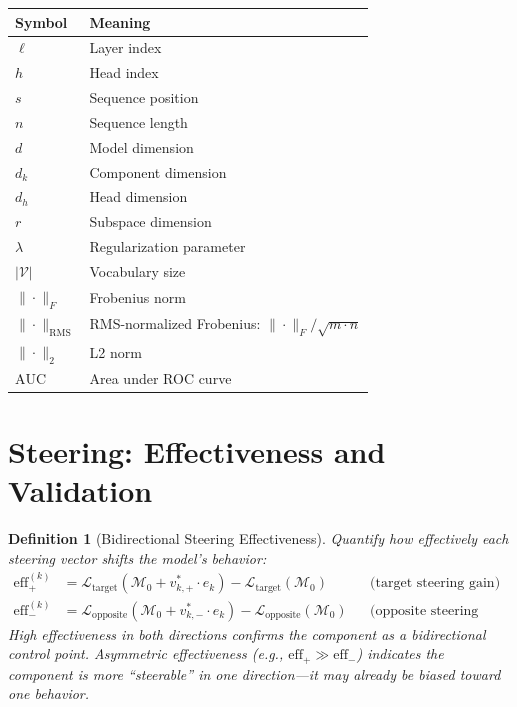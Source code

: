 \documentclass[11pt]{article}
\newtheorem{definition}{Definition}[section]
\begin{document}
\begin{center}
\begin{tabular}{ll}
\toprule
\textbf{Symbol} & \textbf{Meaning} \\
\midrule
$\ell$ & Layer index \\
$h$ & Head index \\
$s$ & Sequence position \\
$n$ & Sequence length \\
$d$ & Model dimension \\
$d_k$ & Component dimension \\
$d_h$ & Head dimension \\
$r$ & Subspace dimension \\
$\lambda$ & Regularization parameter \\
$|\mathcal{V}|$ & Vocabulary size \\
$\|\cdot\|_F$ & Frobenius norm \\
$\|\cdot\|_{\text{RMS}}$ & RMS-normalized Frobenius: $\|\cdot\|_F / \sqrt{m \cdot n}$ \\
$\|\cdot\|_2$ & L2 norm \\
$\text{AUC}$ & Area under ROC curve \\
\bottomrule
\end{tabular}
\end{center}

\section{Steering: Effectiveness and Validation}
\label{app:steering-detail}

\begin{definition}[Bidirectional Steering Effectiveness]
Quantify how effectively each steering vector shifts the model's behavior:
\begin{align}
\text{eff}^{(k)}_+ &= \mathcal{L}_{\text{target}}(\mathcal{M}_0 + v^*_{k,+} \cdot e_k) - \mathcal{L}_{\text{target}}(\mathcal{M}_0) & &\text{(target steering gain)} \\[0.5em]
\text{eff}^{(k)}_- &= \mathcal{L}_{\text{opposite}}(\mathcal{M}_0 + v^*_{k,-} \cdot e_k) - \mathcal{L}_{\text{opposite}}(\mathcal{M}_0) & &\text{(opposite steering gain)}
\end{align}
High effectiveness in both directions confirms the component as a bidirectional control point. Asymmetric effectiveness (e.g., $\text{eff}_+ \gg \text{eff}_-$) indicates the component is more ``steerable'' in one direction---it may already be biased toward one behavior.
\end{definition}
\end{document}
